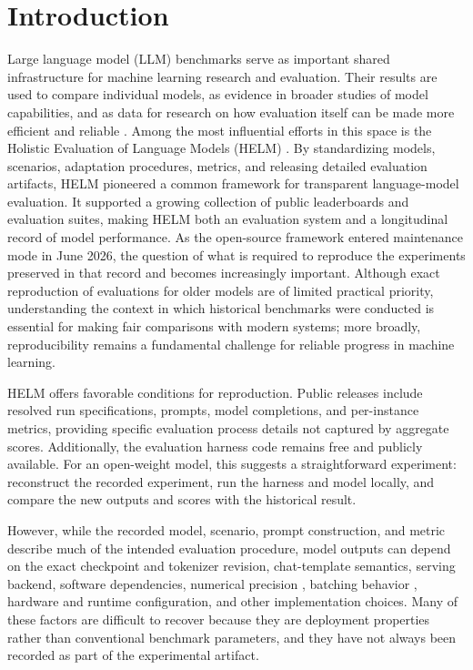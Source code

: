 \section{Introduction}
\label{sec:intro}

Large language model (LLM) benchmarks serve as important shared infrastructure for machine learning research and evaluation. Their results are used to compare individual models, as evidence in broader studies of model capabilities, and as data for research on how evaluation itself can be made more efficient and reliable \citep{bowyer2026efficientbenchmarkingjustfeature, helm2026queryefficientmodelevaluationusing}. Among the most influential efforts in this space is the Holistic Evaluation of Language Models (HELM) \citep{liang2023holistic}. By standardizing models, scenarios, adaptation procedures, metrics, and releasing detailed evaluation artifacts, HELM pioneered a common framework for transparent language-model evaluation. It supported a growing collection of public leaderboards and evaluation suites, making HELM both an evaluation system and a longitudinal record of model performance. As the open-source framework entered maintenance mode in June 2026, the question of what is required to reproduce the experiments preserved in that record and becomes increasingly important. Although exact reproduction of evaluations for older models are of limited practical priority, understanding the context in which historical benchmarks were conducted is essential for making fair comparisons with modern systems; more broadly, reproducibility remains a fundamental challenge for reliable progress in machine learning.

HELM offers favorable conditions for reproduction. Public releases include resolved run specifications, prompts, model completions, and per-instance metrics, providing specific evaluation process details not captured by aggregate scores. Additionally, the evaluation harness code remains free and publicly available. For an open-weight model, this suggests a straightforward experiment: reconstruct the recorded experiment, run the harness and model locally, and compare the new outputs and scores with the historical result.

However, while the recorded model, scenario, prompt construction, and metric describe much of the intended evaluation procedure, model outputs can depend on the exact checkpoint and tokenizer revision, chat-template semantics, serving backend, software dependencies, numerical precision \citep{mekala2025doesquantizationaffectmodels, marchisio2024doesquantizationaffectmultilingual, shi2025systematiccharacterizationllmquantization, shen2024exploring}, batching behavior \citep{yuan2026understanding}, hardware and runtime configuration, and other implementation choices. Many of these factors are difficult to recover because they are deployment properties rather than conventional benchmark parameters, and they have not always been recorded as part of the experimental artifact.

